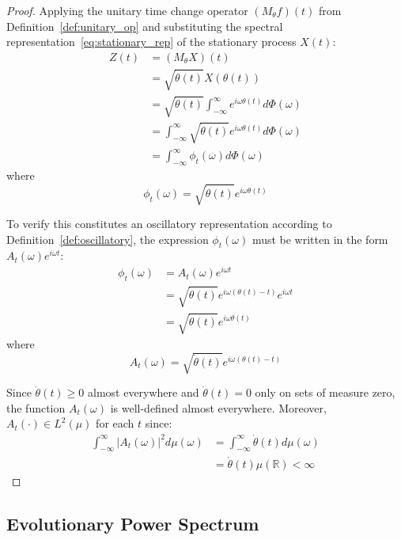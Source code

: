 \documentclass{article}
\begin{document}
\begin{proof}
Applying the unitary time change operator $(M_{\theta} f)(t)$ from Definition~\ref{def:unitary_op} and substituting the spectral representation~\eqref{eq:stationary_rep} of the stationary process $X(t)$:
\begin{align}
Z(t) &= (M_{\theta} X)(t) \\
&= \sqrt{\dot{\theta}(t)} X(\theta(t)) \\
&= \sqrt{\dot{\theta}(t)} \int_{-\infty}^{\infty} e^{i\omega \theta(t)} d\Phi(\omega) \\
&= \int_{-\infty}^{\infty} \sqrt{\dot{\theta}(t)} e^{i\omega \theta(t)} d\Phi(\omega) \\
&= \int_{-\infty}^{\infty} \phi_t(\omega) d\Phi(\omega)
\end{align}
where
\begin{equation}
\phi_t(\omega) = \sqrt{\dot{\theta}(t)} e^{i\omega \theta(t)}
\end{equation}

To verify this constitutes an oscillatory representation according to Definition~\ref{def:oscillatory}, the expression $\phi_t(\omega)$ must be written in the form $A_t(\omega) e^{i\omega t}$:
\begin{align}
\phi_t(\omega) &= A_t(\omega) e^{i\omega t} \\
&= \sqrt{\dot{\theta}(t)} e^{i\omega(\theta(t) - t)} e^{i\omega t} \\
&= \sqrt{\dot{\theta}(t)} e^{i\omega \theta(t)}
\end{align}
where
\begin{equation}
A_t(\omega) = \sqrt{\dot{\theta}(t)} e^{i\omega(\theta(t) - t)}
\end{equation}

Since $\dot{\theta}(t) \geq 0$ almost everywhere and $\dot{\theta}(t) = 0$ only on sets of measure zero, the function $A_t(\omega)$ is well-defined almost everywhere. Moreover, $A_t(\cdot) \in L^2(\mu)$ for each $t$ since:
\begin{align}
\int_{-\infty}^{\infty} |A_t(\omega)|^2 d\mu(\omega) &= \int_{-\infty}^{\infty} \dot{\theta}(t) d\mu(\omega) \\
&= \dot{\theta}(t) \mu(\mathbb{R}) < \infty
\end{align}
\end{proof}

\subsection{Evolutionary Power Spectrum}
\end{document}
